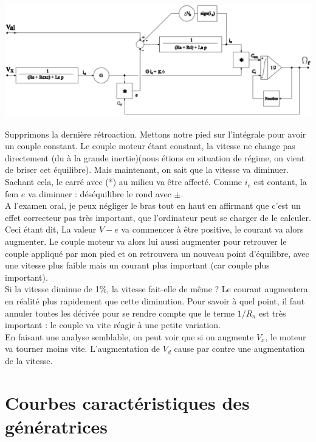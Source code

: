 	\begin{center}
	\includegraphics[scale=0.34]{ch4/image21.png}
	\end{center}
	
	Supprimons la dernière rétroaction. Mettons notre pied sur l'intégrale pour avoir un couple 
	constant. Le couple moteur étant constant, la vitesse ne change pas directement (du à la grande 
	inertie)(nous 
	étions en situation de régime, on vient de briser cet équilibre). Mais maintenant, on sait que 
	la vitesse va diminuer. Sachant cela,  le carré avec (*) au milieu va être affecté. Comme 
	$i_e$ est contant, la fem $e$ va diminuer : déséquilibre le rond avec $\pm$.\\
	
	A l'examen oral, je peux négliger le bras tout en haut en affirmant que c'est un effet 
	correcteur pas très important, que l'ordinateur peut se charger de le calculer.\\
	
	Ceci étant dit, La valeur $V-e$ va commencer à être positive, le courant va alors 
	augmenter. Le couple moteur va alors lui aussi augmenter pour retrouver le couple appliqué 
	par mon pied et on retrouvera un nouveau point d'équilibre, avec une vitesse plus faible 
	mais un courant plus important (car couple plus important).\\
	
	Si la vitesse diminue de 1\%, la vitesse fait-elle de même ? Le courant augmentera en 
	réalité plus rapidement que cette diminution. Pour savoir à quel point, il faut annuler 
	toutes les dérivée pour se rendre compte que le terme $1/R_a$ est très important : le couple 
	va vite réagir à une petite variation.\\
	
	En faisant une analyse semblable, on peut voir que si on augmente $V_x$, le moteur va 
	tourner moins vite. L'augmentation de $V_d$ cause par contre une augmentation de la 
	vitesse.
	
	
\section{Courbes caractéristiques des génératrices}
	
